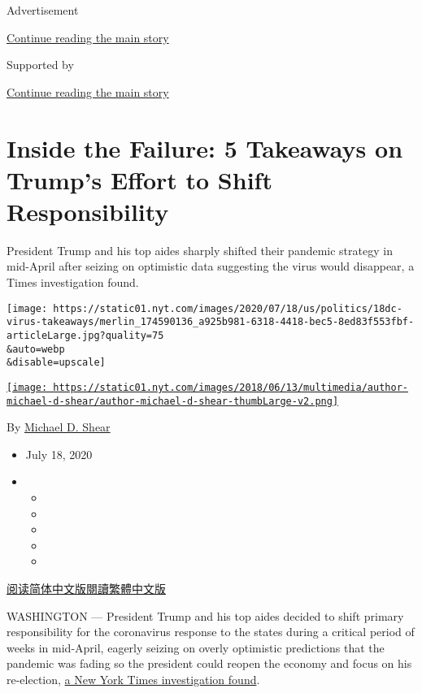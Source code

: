 Advertisement

\protect\hyperlink{after-top}{Continue reading the main story}

Supported by

\protect\hyperlink{after-sponsor}{Continue reading the main story}

\hypertarget{inside-the-failure-5-takeaways-on-trumps-effort-to-shift-responsibility}{%
\section{Inside the Failure: 5 Takeaways on Trump's Effort to Shift
Responsibility}\label{inside-the-failure-5-takeaways-on-trumps-effort-to-shift-responsibility}}

President Trump and his top aides sharply shifted their pandemic
strategy in mid-April after seizing on optimistic data suggesting the
virus would disappear, a Times investigation found.

\texttt{[image: https://static01.nyt.com/images/2020/07/18/us/politics/18dc-virus-takeaways/merlin\_174590136\_a925b981-6318-4418-bec5-8ed83f553fbf-articleLarge.jpg?quality=75\\\&auto=webp\\\&disable=upscale]}

\href{https://www.nytimes.com/by/michael-d-shear}{\texttt{[image: https://static01.nyt.com/images/2018/06/13/multimedia/author-michael-d-shear/author-michael-d-shear-thumbLarge-v2.png]}}

By \href{https://www.nytimes.com/by/michael-d-shear}{Michael D. Shear}

\begin{itemize}
\item
  July 18, 2020
\item
  \begin{itemize}
  \item
  \item
  \item
  \item
  \item
  \end{itemize}
\end{itemize}

\href{https://cn.nytimes.com/usa/20200720/trump-coronavirus-failure-takeaways/}{阅读简体中文版}\href{https://cn.nytimes.com/usa/20200720/trump-coronavirus-failure-takeaways/zh-hant/}{閱讀繁體中文版}

WASHINGTON --- President Trump and his top aides decided to shift
primary responsibility for the coronavirus response to the states during
a critical period of weeks in mid-April, eagerly seizing on overly
optimistic predictions that the pandemic was fading so the president
could reopen the economy and focus on his re-election,
\href{https://www.nytimes.com/2020/07/18/us/politics/trump-coronavirus-response-failure-leadership.html}{a
New York Times investigation found}.

